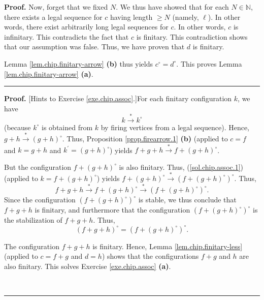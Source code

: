 \documentclass[numbers=enddot,12pt,final,onecolumn,notitlepage]{scrartcl}%
\theoremstyle{definition}
\newenvironment{proof}[1][Proof]{\noindent\textbf{#1.} }{\ \rule{0.5em}{0.5em}}
\begin{document}
\begin{proof}
Now, forget that we fixed $N$. We thus have showed that for each
$N\in\mathbb{N}$, there exists a legal sequence for $c$ having length $\geq N$
(namely, $\ell$). In other words, there exist arbitrarily long legal sequences
for $c$. In other words, $c$ is infinitary. This contradicts the fact that $c$
is finitary. This contradiction shows that our assumption was false. Thus, we
have proven that $d$ is finitary.

Lemma \ref{lem.chip.finitary-arrow} \textbf{(b)} thus yields $c^{\circ
}=d^{\circ}$. This proves Lemma \ref{lem.chip.finitary-arrow} \textbf{(a)}.
\end{proof}

\begin{proof}
[Hints to Exercise \ref{exe.chip.assoc}.]For each finitary configuration $k$,
we have%
\begin{equation}
k\overset{\ast}{\rightarrow}k^{\circ} \label{sol.chip.assoc.1}%
\end{equation}
(because $k^{\circ}$ is obtained from $k$ by firing vertices from a legal
sequence). Hence, $g+h\overset{\ast}{\rightarrow}\left(  g+h\right)  ^{\circ}%
$. Thus, Proposition \ref{prop.firearrow.1} \textbf{(b)} (applied to $c=f$ and
$k=g+h$ and $k^{\prime}=\left(  g+h\right)  ^{\circ}$) yields
$f+g+h\overset{\ast}{\rightarrow}f+\left(  g+h\right)  ^{\circ}$.

But the configuration $f+\left(  g+h\right)  ^{\circ}$ is also finitary. Thus,
(\ref{sol.chip.assoc.1}) (applied to $k=f+\left(  g+h\right)  ^{\circ}$)
yields $f+\left(  g+h\right)  ^{\circ}\overset{\ast}{\rightarrow}\left(
f+\left(  g+h\right)  ^{\circ}\right)  ^{\circ}$. Thus,%
\[
f+g+h\overset{\ast}{\rightarrow}f+\left(  g+h\right)  ^{\circ}\overset{\ast
}{\rightarrow}\left(  f+\left(  g+h\right)  ^{\circ}\right)  ^{\circ}.
\]
Since the configuration $\left(  f+\left(  g+h\right)  ^{\circ}\right)
^{\circ}$ is stable, we thus conclude that $f+g+h$ is finitary, and
furthermore that the configuration $\left(  f+\left(  g+h\right)  ^{\circ
}\right)  ^{\circ}$ is the stabilization of $f+g+h$. Thus,
\begin{equation}
\left(  f+g+h\right)  ^{\circ}=\left(  f+\left(  g+h\right)  ^{\circ}\right)
^{\circ}. \label{sol.chip.assoc.4}%
\end{equation}


The configuration $f+g+h$ is finitary. Hence, Lemma
\ref{lem.chip.finitary-less} (applied to $c=f+g$ and $d=h$) shows that the
configurations $f+g$ and $h$ are also finitary. This solves Exercise
\ref{exe.chip.assoc} \textbf{(a)}.


\end{proof}
\end{document}
